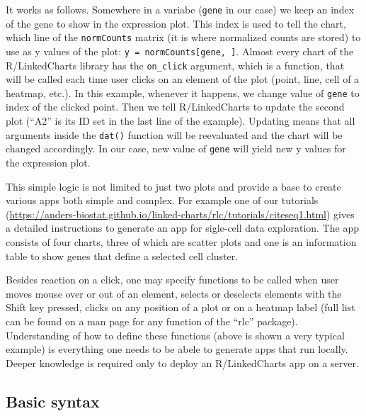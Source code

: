 \documentclass[twocolumn,10pt]{article}
\begin{document}
It works as follows. Somewhere in a variabe (\texttt{gene} in our case) we keep an index of the gene to show in the expression plot. This index is used to tell the chart, which line of the \texttt{normCounts} matrix (it is where normalized counts are stored) to use as y values of the plot: \texttt{y = normCounts[gene, ]}. Almost every chart of the R/LinkedCharts library has the \texttt{on_click} argument, which is a function, that will be called each time user clicks on an element of the plot (point, line, cell of a heatmap, etc.). In this example, whenever it happens, we change value of \texttt{gene} to index of the clicked point. Then we tell R/LinkedCharts to update the second plot (``A2'' is its ID set in the last line of the example). Updating means that all arguments inside the \texttt{dat()} function will be reevaluated and the chart will be changed accordingly. In our case, new value of \texttt{gene} will yield new y values for the expression plot.

This simple logic is not limited to just two plots and provide a base to create various apps both simple and complex. For example one of our tutorials (\url{https://anders-biostat.github.io/linked-charts/rlc/tutorials/citeseq1.html}) gives a detailed instructions to generate an app for sigle-cell data exploration. The app consists of four charts, three of which are scatter plots and one is an information table to show genes that define a selected cell cluster.

Besides reaction on a click, one may specify functions to be called when user moves mouse over or out of an element, selects or deselects elements with the Shift key pressed, clicks on any position of a plot or on a heatmap label (full list can be found on a man page for any function of the ``rlc'' package). Understanding of how to define these functions (above is shown a very typical example) is everything one needs to be abele to generate apps that run locally. Deeper knowledge is required only to deploy an R/LinkedCharts app on a server. 

\subsection{Basic syntax}
\end{document}
